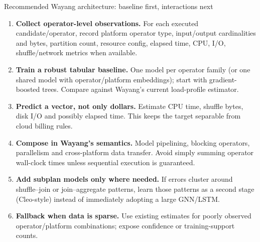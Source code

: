\documentclass[aspectratio=169,10pt]{beamer}
\begin{document}
\begin{frame}[shrink=10]{Recommended Wayang architecture: baseline first, interactions next}
\small
\begin{enumerate}\setlength\itemsep{3pt}
  \item \textbf{Collect operator-level observations.} For each executed candidate/operator, record platform operator type, input/output cardinalities and bytes, partition count, resource config, elapsed time, CPU, I/O, shuffle/network metrics when available.
  \item \textbf{Train a robust tabular baseline.} One model per operator family (or one shared model with operator/platform embeddings); start with gradient-boosted trees. Compare against Wayang's current load-profile estimator.
  \item \textbf{Predict a vector, not only dollars.} Estimate CPU time, shuffle bytes, disk I/O and possibly elapsed time. This keeps the target separable from cloud billing rules.
  \item \textbf{Compose in Wayang's semantics.} Model pipelining, blocking operators, parallelism and cross-platform data transfer. Avoid simply summing operator wall-clock times unless sequential execution is guaranteed.
  \item \textbf{Add subplan models only where needed.} If errors cluster around shuffle--join or join--aggregate patterns, learn those patterns as a second stage (Cleo-style) instead of immediately adopting a large GNN/LSTM.
  \item \textbf{Fallback when data is sparse.} Use existing estimates for poorly observed operator/platform combinations; expose confidence or training-support counts.
\end{enumerate}
\end{frame}
\end{document}

